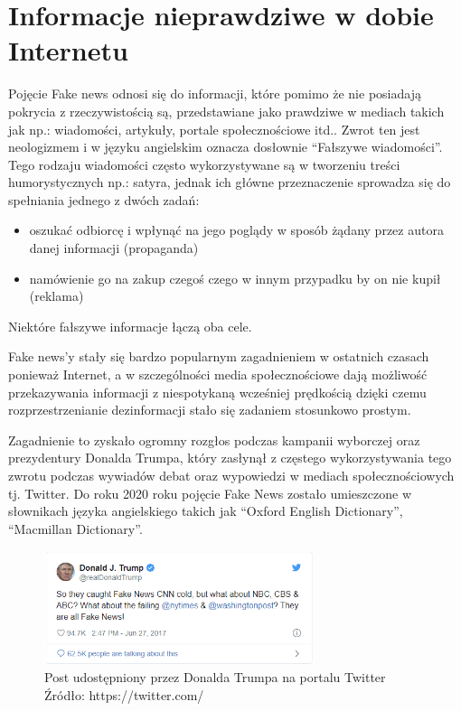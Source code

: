 \chapter{Informacje nieprawdziwe w dobie Internetu}
Pojęcie Fake news odnosi się do 
informacji, które pomimo że nie posiadają pokrycia z rzeczywistością są,
przedstawiane jako prawdziwe w mediach takich jak np.: wiadomości, artykuły, 
portale społecznościowe itd.. 
Zwrot ten jest neologizmem i w języku angielskim oznacza dosłownie ``Fałszywe wiadomości''.
Tego rodzaju wiadomości często wykorzystywane są w tworzeniu treści humorystycznych 
np.: satyra, jednak ich główne przeznaczenie sprowadza się do spełniania jednego z dwóch zadań:
\begin{itemize}
    \item oszukać odbiorcę i wpłynąć na jego poglądy w sposób żądany przez autora danej informacji (propaganda)
    \item namówienie go na zakup czegoś czego w innym przypadku by on nie kupił (reklama)
\end{itemize} 
Niektóre fałszywe informacje łączą oba cele.

Fake news'y stały się bardzo popularnym zagadnieniem w ostatnich czasach ponieważ
Internet, a w szczególności media społecznościowe dają możliwość przekazywania
informacji z niespotykaną wcześniej prędkością dzięki czemu rozprzestrzenianie 
dezinformacji stało się zadaniem stosunkowo prostym.

Zagadnienie to zyskało ogromny rozgłos podczas kampanii wyborczej oraz
prezydentury Donalda Trumpa, który zasłynął z częstego wykorzystywania 
tego zwrotu podczas wywiadów debat oraz wypowiedzi w mediach społecznościowych
tj. Twitter.
Do roku 2020 roku pojęcie Fake News zostało umieszczone w słownikach języka angielskiego
takich jak ``Oxford English Dictionary'', ``Macmillan Dictionary''.
\begin{figure}[h!]
    \centering
    \includegraphics[width=0.7\textwidth]{./Img/Trump-Fake-News.png}
    \caption{Post udostępniony przez Donalda Trumpa na portalu Twitter Źródło: https://twitter.com/}
\end{figure}

